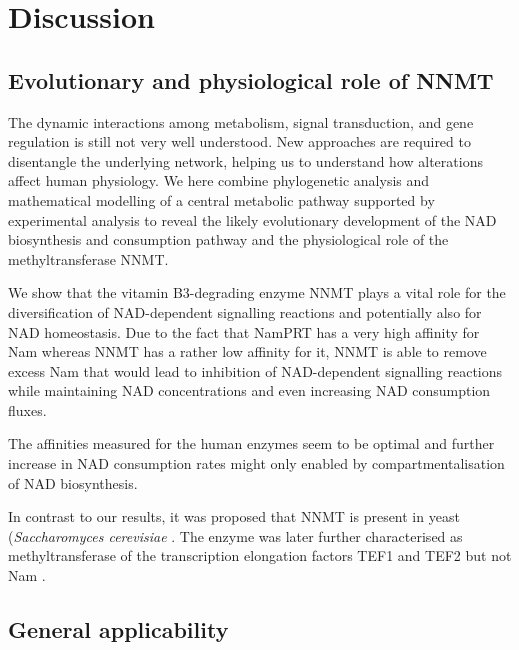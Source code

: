 
\section{Discussion}

\subsection{Evolutionary and physiological role of NNMT}

The dynamic interactions among metabolism, signal transduction, and gene regulation is still not very well understood. New approaches are required to disentangle the underlying network, helping us to understand how alterations affect human physiology. We here combine phylogenetic analysis and mathematical modelling of a central metabolic pathway supported by experimental analysis to reveal the likely evolutionary development of the NAD biosynthesis and consumption pathway and the physiological role of the methyltransferase NNMT.

We show that the vitamin B3-degrading enzyme NNMT plays a vital role for the diversification of NAD-dependent signalling reactions and potentially also for NAD homeostasis. Due to the fact that NamPRT has a very high affinity for Nam whereas NNMT has a rather low affinity for it, NNMT is able to remove excess Nam that would lead to inhibition of NAD-dependent signalling reactions while maintaining NAD concentrations and even increasing NAD consumption fluxes.

The affinities measured for the human enzymes seem to be optimal and further increase in NAD consumption rates might only enabled by compartmentalisation of NAD biosynthesis.

In contrast to our results, it was proposed that NNMT is present in yeast (\textit{Saccharomyces cerevisiae} \cite{Anderson2003}. The enzyme was later further characterised as methyltransferase of the transcription elongation factors TEF1 and TEF2 but not Nam \cite{Wlodarski2011}.


\subsection{General applicability}

